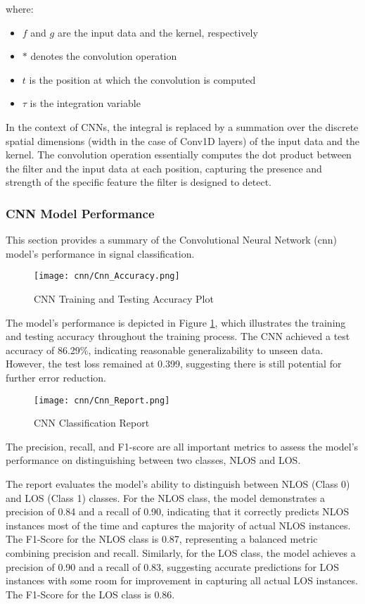 where:

\begin{itemize}
  \item $f$ and $g$ are the input data and the kernel, respectively
  \item $*$ denotes the convolution operation
  \item $t$ is the position at which the convolution is computed
  \item $\tau$ is the integration variable
\end{itemize}

In the context of CNNs, the integral is replaced by a summation over the discrete spatial dimensions (width in the case of Conv1D layers) of the input data and the kernel. The convolution operation essentially computes the dot product between the filter and the input data at each position, capturing the presence and strength of the specific feature the filter is designed to detect.


\subsubsection{CNN Model Performance}

This section provides a summary of the Convolutional Neural Network (\gls{cnn}) model's performance in signal classification.

\begin{figure}[H] 
	\centering
	\texttt{[image: cnn/Cnn\_Accuracy.png]}
	\caption{CNN Training and Testing Accuracy Plot}\label{cnn_accuracy}
\end{figure}

The model's performance is depicted in Figure \ref{cnn_accuracy}, which illustrates the training and testing accuracy throughout the training process. The CNN achieved a test accuracy of 86.29\%, indicating reasonable generalizability to unseen data. However, the test loss remained at 0.399, suggesting there is still potential for further error reduction. 

\begin{figure}[H] 
	\centering
	\texttt{[image: cnn/Cnn\_Report.png]}
	\caption{CNN Classification Report}\label{cnn_report}
\end{figure}

The precision, recall, and F1-score are all important metrics to assess the model's performance on distinguishing between two classes, NLOS and LOS.

The report evaluates the model's ability to distinguish between NLOS (Class 0) and LOS (Class 1) classes. For the NLOS class, the model demonstrates a precision of  0.84 and a recall of 0.90, indicating that it correctly predicts NLOS instances most of the time and captures the majority of actual NLOS instances. The F1-Score for the NLOS class is 0.87, representing a balanced metric combining precision and recall. Similarly, for the LOS class, the model achieves a precision of 0.90 and a recall of 0.83, suggesting accurate predictions for LOS instances with some room for improvement in capturing all actual LOS instances. The F1-Score for the LOS class is 0.86.

